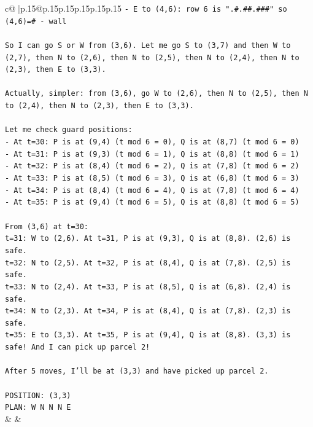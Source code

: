 \documentclass{article}
\begin{document}
{\begin{supertabular}{c@{$\;$}|p{.15\linewidth}@{}p{.15\linewidth}p{.15\linewidth}p{.15\linewidth}p{.15\linewidth}p{.15\linewidth}}
{{{\texttt{{-} E to (4,6): row 6 is ".\#.\#\#.\#\#\#" so (4,6)=\# {-} wall} \\
\\ 
\texttt{So I can go S or W from (3,6). Let me go S to (3,7) and then W to (2,7), then N to (2,6), then N to (2,5), then N to (2,4), then N to (2,3), then E to (3,3).} \\
\\ 
\texttt{Actually, simpler: from (3,6), go W to (2,6), then N to (2,5), then N to (2,4), then N to (2,3), then E to (3,3).} \\
\\ 
\texttt{Let me check guard positions:} \\
\texttt{{-} At t=30: P is at (9,4) (t mod 6 = 0), Q is at (8,7) (t mod 6 = 0)} \\
\texttt{{-} At t=31: P is at (9,3) (t mod 6 = 1), Q is at (8,8) (t mod 6 = 1)} \\
\texttt{{-} At t=32: P is at (8,4) (t mod 6 = 2), Q is at (7,8) (t mod 6 = 2)} \\
\texttt{{-} At t=33: P is at (8,5) (t mod 6 = 3), Q is at (6,8) (t mod 6 = 3)} \\
\texttt{{-} At t=34: P is at (8,4) (t mod 6 = 4), Q is at (7,8) (t mod 6 = 4)} \\
\texttt{{-} At t=35: P is at (9,4) (t mod 6 = 5), Q is at (8,8) (t mod 6 = 5)} \\
\\ 
\texttt{From (3,6) at t=30:} \\
\texttt{t=31: W to (2,6). At t=31, P is at (9,3), Q is at (8,8). (2,6) is safe.} \\
\texttt{t=32: N to (2,5). At t=32, P is at (8,4), Q is at (7,8). (2,5) is safe.} \\
\texttt{t=33: N to (2,4). At t=33, P is at (8,5), Q is at (6,8). (2,4) is safe.} \\
\texttt{t=34: N to (2,3). At t=34, P is at (8,4), Q is at (7,8). (2,3) is safe.} \\
\texttt{t=35: E to (3,3). At t=35, P is at (9,4), Q is at (8,8). (3,3) is safe! And I can pick up parcel 2!} \\
\\ 
\texttt{After 5 moves, I'll be at (3,3) and have picked up parcel 2.} \\
\\ 
\texttt{POSITION: (3,3)} \\
\texttt{PLAN: W N N N E} \\
            }
        }
    }
    & & \\ \\


\end{supertabular}}
\end{document}

